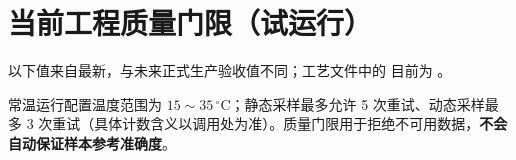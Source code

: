 \section{当前工程质量门限（\textbf{试运行}）}
以下值来自最新，与未来正式生产验收值不同；工艺文件中的 目前为 。

常温运行配置温度范围为 $15\sim35\, ^\circ\mathrm C$；静态采样最多允许 5 次重试、动态采样最多 3 次重试（具体计数含义以调用处为准）。质量门限用于拒绝不可用数据，\textbf{不会自动保证样本参考准确度}。
